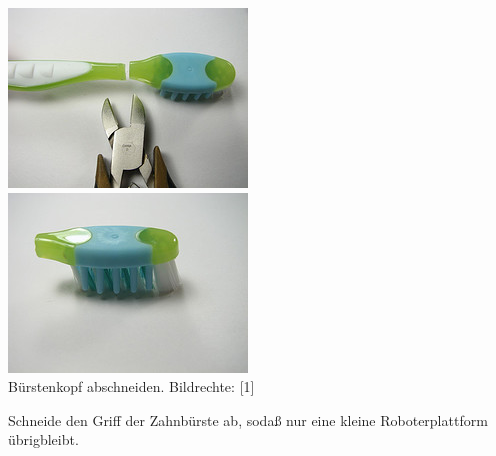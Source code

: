 \begin{center}
\includegraphics[width=\linewidth]{bristlebot/bristlebot4.jpg}\\
\includegraphics[width=\linewidth]{bristlebot/bristlebot5.jpg}\\
\footnotesize{Bürstenkopf abschneiden. Bildrechte: [1]}
\end{center}

Schneide den Griff der Zahnbürste ab, sodaß nur eine kleine Roboterplattform übrigbleibt. \\ 

